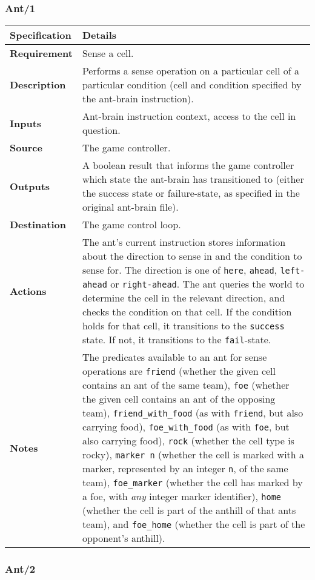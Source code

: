 \documentclass[11pt]{article}
\begin{document}
\subsubsection*{Ant/1}\label{ant1}

\begin{longtable}[c]{@{\extracolsep{\fill}}|p{}|p{}|@{}}
\hline
Specification & Details\tabularnewline
\hline

\textbf{Requirement} & Sense a cell.\tabularnewline
\textbf{Description} & Performs a sense operation on a particular cell
of a particular condition (cell and condition specified by the ant-brain
instruction).\tabularnewline
\textbf{Inputs} & Ant-brain instruction context, access to the cell in
question.\tabularnewline
\textbf{Source} & The game controller.\tabularnewline
\textbf{Outputs} & A boolean result that informs the game controller
which state the ant-brain has transitioned to (either the success state
or failure-state, as specified in the original ant-brain
file).\tabularnewline
\textbf{Destination} & The game control loop.\tabularnewline
\textbf{Actions} & The ant's current instruction stores information
about the direction to sense in and the condition to sense for. The
direction is one of \texttt{here}, \texttt{ahead}, \texttt{left-ahead}
or \texttt{right-ahead}. The ant queries the world to determine the cell
in the relevant direction, and checks the condition on that cell. If the
condition holds for that cell, it transitions to the \texttt{success}
state. If not, it transitions to the \texttt{fail}-state.\tabularnewline
\textbf{Notes} & The predicates available to an ant for sense operations
are \texttt{friend} (whether the given cell contains an ant of the same
team), \texttt{foe} (whether the given cell contains an ant of the
opposing team), \texttt{friend\_with\_food} (as with \texttt{friend},
but also carrying food), \texttt{foe\_with\_food} (as with \texttt{foe},
but also carrying food), \texttt{rock} (whether the cell type is rocky),
\texttt{marker\ n} (whether the cell is marked with a marker,
represented by an integer \texttt{n}, of the same team),
\texttt{foe\_marker} (whether the cell has marked by a foe, with
\emph{any} integer marker identifier), \texttt{home} (whether the cell
is part of the anthill of that ants team), and \texttt{foe\_home}
(whether the cell is part of the opponent's anthill).\tabularnewline
\hline
\end{longtable}

\subsubsection*{Ant/2}\label{ant2}
\end{document}
